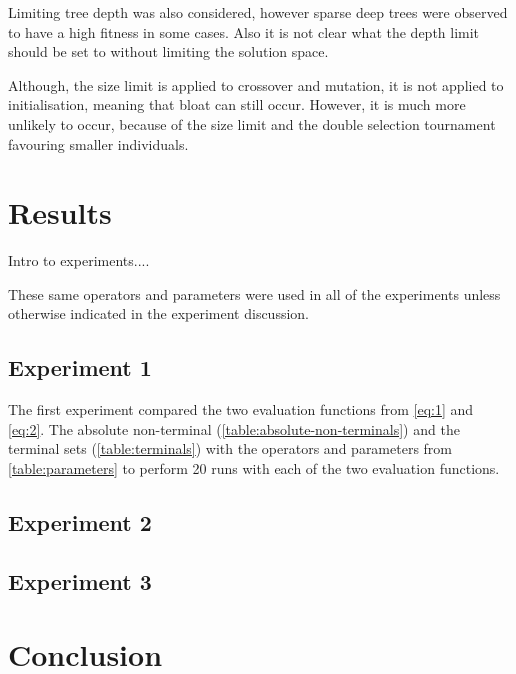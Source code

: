 \documentclass[12pt,a4paper]{article}
\begin{document}
	Limiting tree depth was also considered, however sparse deep trees were observed to have a high fitness in some cases. Also it is not clear what the depth limit should be set to without limiting the solution space. 
	
	Although, the size limit is applied to crossover  and mutation, it is not applied to initialisation, meaning that bloat can still occur. However, it is much more unlikely to occur, because of the size limit and the double selection tournament favouring smaller individuals.

	\section{Results} \label{results}
	Intro to experiments....
	
	These same operators and parameters were used in all of the experiments unless otherwise indicated in the experiment discussion.
	
	\subsection{Experiment 1}
	The first experiment compared the two evaluation functions from \autoref{eq:1} and \autoref{eq:2}. The absolute non-terminal (\autoref{table:absolute-non-terminals}) and the terminal sets (\autoref{table:terminals}) with the operators and parameters from \autoref{table:parameters} to perform 20 runs with each of the two evaluation functions.
	
	\subsection{Experiment 2}
	
	\subsection{Experiment 3}

	\section{Conclusion} \label{conclusions}

	\printbibliography
	
	\appendix
	
\end{document}
